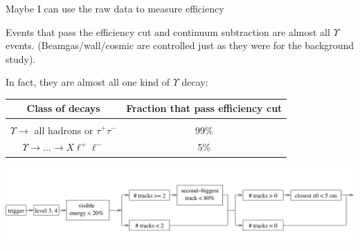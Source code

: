 \documentclass[landscape]{article}
\begin{document}
{\Huge Maybe I can use the raw data to measure efficiency}

\vfill
Events that pass the efficiency cut and continuum subtraction are
almost all $\Upsilon$ events.  (Beamgas/wall/cosmic are controlled
just as they were for the background study).

\vfill
In fact, they are almost all one kind of $\Upsilon$ decay:
\vspace{0.25 cm}
\begin{center}
  \begin{tabular}{c c}
    \vspace{0.25 cm}
    \hspace{0.25 cm} Class of decays \hspace{0.25 cm} & \hspace{0.25 cm} Fraction that pass efficiency cut \hspace{0.25 cm} \\\hline
    \vspace{-0.5 cm}
    & \\
    \vspace{0.25 cm}
    \hspace{0.25 cm} $\Upsilon \to$ all hadrons or $\tau^+ \tau^-$ \hspace{0.25 cm} & \hspace{0.25 cm} 99\% \hspace{0.25 cm} \\
    \vspace{0.25 cm}
    \hspace{0.25 cm} $\Upsilon \to \ldots \to X \ell^+ \ell^-$ \hspace{0.25 cm} & \hspace{0.25 cm} 5\% \hspace{0.25 cm}
  \end{tabular}
\end{center}

\vfill
\begin{center}
\includegraphics[width=\linewidth]{reffcuts0.pdf}
\end{center}
\vfill
\pagebreak
\end{document}
